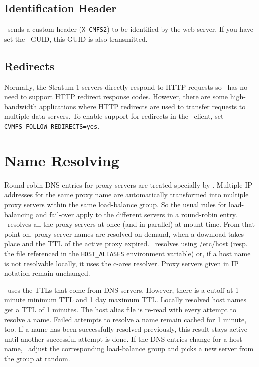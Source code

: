 \subsection{Identification Header}
\cvmfs\ sends a custom header (\lstinline{X-CMFS2}) to be identified by the web server.
If you have set the \cernvm\ GUID, this GUID is also transmitted.

\subsection{Redirects}
Normally, the Stratum-1 servers directly respond to HTTP requests so
\cvmfs\ has no need to support HTTP redirect response codes.  However,
there are some high-bandwidth applications where HTTP redirects are used
to transfer requests to multiple data servers.  To enable support for
redirects in the \cvmfs\ client, set \texttt{CVMFS\_FOLLOW\_REDIRECTS=yes}.

\section{Name Resolving}
Round-robin DNS entries for proxy servers are treated specially by \cvmfs.
Multiple IP addresses for the same proxy name are automatically transformed into multiple proxy servers within the same load-balance group.
So the usual rules for load-balancing and fail-over apply to the different servers in a round-robin entry.
\cvmfs\ resolves all the proxy servers at once (and in parallel) at mount time.
From that point on, proxy server names are resolved on demand, when a download takes place and the TTL of the active proxy expired.
\cvmfs\ resolves using /etc/host (resp. the file referenced in the \texttt{HOST\_ALIASES} environment variable) or, if a host name is not resolvable locally, it uses the c-ares resolver.
Proxy servers given in IP notation remain unchanged.

\cvmfs\ uses the TTLs that come from DNS servers. 
However, there is a cutoff at 1 minute minimum TTL and 1 day maximum TTL.
Locally resolved host names get a TTL of 1 minutes.
The host alias file is re-read with every attempt to resolve a name.
Failed attempts to resolve a name remain cached for 1 minute, too.
If a name has been successfully resolved previously, this result stays active until another successful attempt is done.
If the DNS entries change for a host name, \cvmfs\ adjust the corresponding load-balance group and picks a new server from the group at random.

